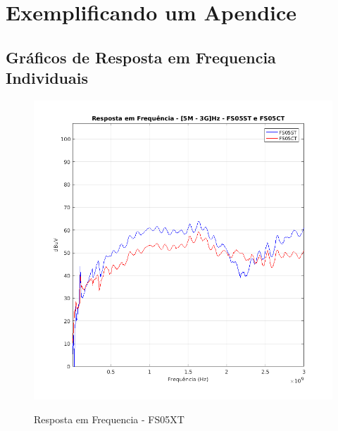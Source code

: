\chapter{Exemplificando um Apendice}

\section{Gráficos de Resposta em Frequencia Individuais}

\begin{figure}[H]
	\centering 
	\caption{Resposta em Frequencia - FS05XT}
	\includegraphics[scale=0.7]{./img/FS05XT}
	\label{fig:FS05XT}
\end{figure}

